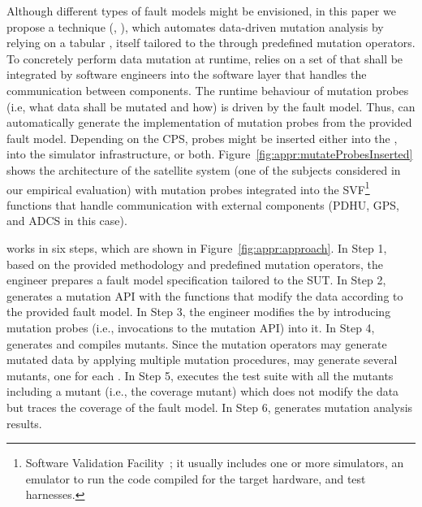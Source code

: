 Although different types of fault models might be envisioned,
in this paper we propose a technique (, \APPR),
which automates data-driven mutation analysis by relying on
a tabular , itself tailored to the  through predefined mutation operators.
To concretely perform data mutation at runtime, \APPR relies on a set of  that shall be integrated by software engineers into the software layer that handles the communication between components. The runtime behaviour of mutation probes (i.e, what data shall be mutated and how) is driven by the fault model. Thus, \APPR can automatically generate the implementation of mutation probes from the provided fault model.
Depending on the CPS, probes might be inserted either into the , into the simulator infrastructure, or both.
Figure~\ref{fig:appr:mutateProbesInserted} shows the architecture of the \ESAIL satellite system (one of the subjects considered in our empirical evaluation) with mutation probes integrated into the SVF\footnote{Software Validation Facility~\cite{Isasi2019}; it usually includes one or more simulators, an emulator to run the code compiled for the target hardware, and test harnesses.} functions that handle communication with external components (PDHU, GPS, and ADCS in this case). 



\APPR works in six steps, which are shown in Figure~\ref{fig:appr:approach}. 
In Step 1, based on the provided methodology and predefined mutation operators, the engineer prepares a fault model specification tailored to the SUT.
In Step 2, \APPR generates a mutation API with the functions that modify the data according to the provided fault model.
In Step 3, the engineer modifies the  by introducing mutation probes (i.e., invocations to the mutation API) into it.
In Step 4, \APPR generates and compiles mutants. 
Since the \APPR mutation operators may generate mutated data by applying multiple mutation procedures, \APPR may generate several mutants, one for each .
In Step 5, \APPR executes the test suite with all the mutants including a mutant (i.e., the coverage mutant) which does not  modify the data but traces the coverage of the fault model.
In Step 6, \APPR generates mutation analysis results.

